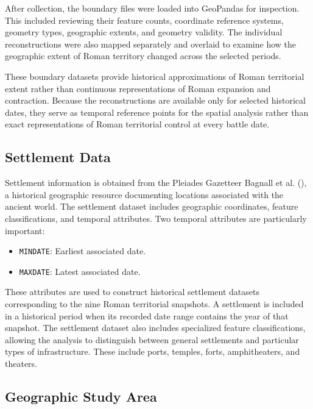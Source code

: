 \documentclass[
  letterpaper,
  DIV=11,
  numbers=noendperiod]{scrartcl}
\providecommand{\tightlist}{%
  \setlength{\itemsep}{0pt}\setlength{\parskip}{0pt}}\usepackage{longtable,booktabs,array}
\begin{document}
After collection, the boundary files were loaded into GeoPandas for
inspection. This included reviewing their feature counts, coordinate
reference systems, geometry types, geographic extents, and geometry
validity. The individual reconstructions were also mapped separately and
overlaid to examine how the geographic extent of Roman territory changed
across the selected periods.

These boundary datasets provide historical approximations of Roman
territorial extent rather than continuous representations of Roman
expansion and contraction. Because the reconstructions are available
only for selected historical dates, they serve as temporal reference
points for the spatial analysis rather than exact representations of
Roman territorial control at every battle date.

\subsection{Settlement Data}\label{settlement-data}

Settlement information is obtained from the Pleiades Gazetteer Bagnall
et al. (), a historical geographic resource
documenting locations associated with the ancient world. The settlement
dataset includes geographic coordinates, feature classifications, and
temporal attributes. Two temporal attributes are particularly important:

\begin{itemize}
\tightlist
\item
  \texttt{MINDATE}: Earliest associated date.
\item
  \texttt{MAXDATE}: Latest associated date.
\end{itemize}

These attributes are used to construct historical settlement datasets
corresponding to the nine Roman territorial snapshots. A settlement is
included in a historical period when its recorded date range contains
the year of that snapshot. The settlement dataset also includes
specialized feature classifications, allowing the analysis to
distinguish between general settlements and particular types of
infrastructure. These include ports, temples, forts, amphitheaters, and
theaters.

\subsection{Geographic Study Area}\label{geographic-study-area}
\end{document}
